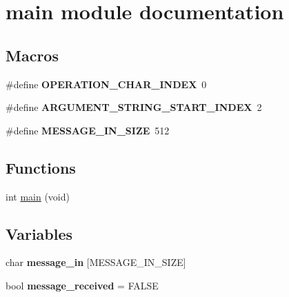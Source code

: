 \hypertarget{group__main__module}{}\section{main module documentation}
\label{group__main__module}
\subsection*{Macros}
\begin{DoxyCompactItemize}
\item 
\mbox{\label{group__main__module_ga4cb0befa11db6e30cc1d9f5a514e25cc}} 
\#define {\bfseries O\+P\+E\+R\+A\+T\+I\+O\+N\+\_\+\+C\+H\+A\+R\+\_\+\+I\+N\+D\+EX}~0
\item 
\mbox{\label{group__main__module_ga2c87544a1e911893640803d8d53eb359}} 
\#define {\bfseries A\+R\+G\+U\+M\+E\+N\+T\+\_\+\+S\+T\+R\+I\+N\+G\+\_\+\+S\+T\+A\+R\+T\+\_\+\+I\+N\+D\+EX}~2
\item 
\mbox{\label{group__main__module_ga0a6be681e3cf415db61acfcf8ef8b49e}} 
\#define {\bfseries M\+E\+S\+S\+A\+G\+E\+\_\+\+I\+N\+\_\+\+S\+I\+ZE}~512
\end{DoxyCompactItemize}
\subsection*{Functions}
\begin{DoxyCompactItemize}
\item 
int \hyperlink{group__main__module_ga840291bc02cba5474a4cb46a9b9566fe}{main} (void)
\end{DoxyCompactItemize}
\subsection*{Variables}
\begin{DoxyCompactItemize}
\item 
\mbox{\label{group__main__module_ga35ff2cde27431c086ae7048c761c5c49}} 
char {\bfseries message\+\_\+in} \mbox{[}M\+E\+S\+S\+A\+G\+E\+\_\+\+I\+N\+\_\+\+S\+I\+ZE\mbox{]}
\item 
\mbox{\label{group__main__module_ga9a75d3b2e50a13d5eed2e8c1068f0acb}} 
bool {\bfseries message\+\_\+received} = F\+A\+L\+SE
\end{DoxyCompactItemize}


